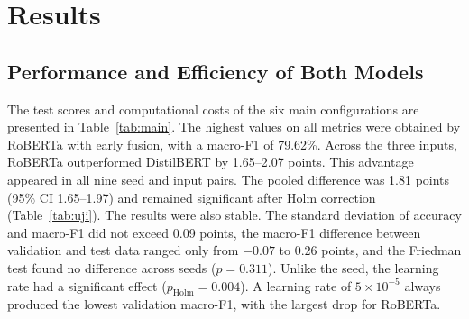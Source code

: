 \documentclass[conference]{IEEEtran}
\begin{document}
\section{Results}

\subsection{Performance and Efficiency of Both Models}
The test scores and computational costs of the six main configurations are presented in Table~\ref{tab:main}. The highest values on all metrics were obtained by RoBERTa with early fusion, with a macro-F1 of 79.62\%. Across the three inputs, RoBERTa outperformed DistilBERT by 1.65--2.07 points. This advantage appeared in all nine seed and input pairs. The pooled difference was 1.81 points (95\% CI 1.65--1.97) and remained significant after Holm correction (Table~\ref{tab:uji}). The results were also stable. The standard deviation of accuracy and macro-F1 did not exceed 0.09 points, the macro-F1 difference between validation and test data ranged only from $-0.07$ to 0.26 points, and the Friedman test found no difference across seeds ($p = 0.311$). Unlike the seed, the learning rate had a significant effect ($p_{\mathrm{Holm}} = 0.004$). A learning rate of $5 \times 10^{-5}$ always produced the lowest validation macro-F1, with the largest drop for RoBERTa.
\end{document}
